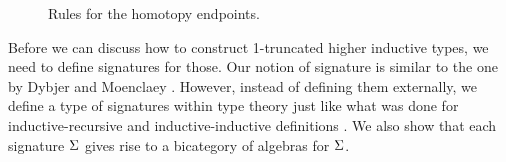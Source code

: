 \begin{figure*}
\vspace{5pt}

\begin{center}
\begin{bprooftree}
\end{bprooftree}
\end{center}

\vspace{5pt}

\begin{center}
\begin{bprooftree}
\end{bprooftree}
\begin{bprooftree}
\end{bprooftree}
\end{center}


\caption{Rules for the homotopy endpoints.}
\label{fig:homot_ep}
\end{figure*}

Before we can discuss how to construct 1-truncated higher inductive types,
we need to define signatures for those.
Our notion of signature is similar to the one by Dybjer and Moenclaey \cite{DBLP:journals/entcs/DybjerM18}.
However, instead of defining them externally, we define a type of signatures within type theory
just like what was done for inductive-recursive and inductive-inductive
definitions \cite{Dybjer1999AFA,forsberg2012finite}. 
We also show that each signature $\sign$ gives rise to a bicategory of algebras for $\sign$.


